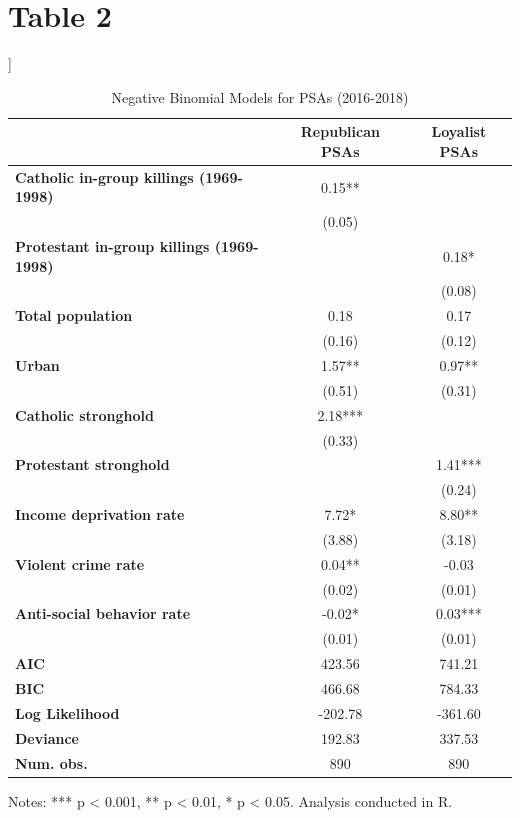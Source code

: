 \documentclass[12pt,letterpaper]{article}
\begin{document}
\section*{Table 2}
	]
	
	\begin{table}[htbp]
		\centering
		\caption{Negative Binomial Models for PSAs (2016-2018)}
		\begin{tabular}{lcc}
			\toprule
			& \textbf{Republican PSAs} & \textbf{Loyalist PSAs} \\
			\midrule
			\textbf{Catholic in-group killings (1969-1998)} & 0.15** & \\
			& (0.05) & \\
			\textbf{Protestant in-group killings (1969-1998)} & & 0.18* \\
			& & (0.08) \\
			\textbf{Total population} & 0.18 & 0.17 \\
			& (0.16) & (0.12) \\
			\textbf{Urban} & 1.57** & 0.97** \\
			& (0.51) & (0.31) \\
			\textbf{Catholic stronghold} & 2.18*** & \\
			& (0.33) & \\
			\textbf{Protestant stronghold} & & 1.41*** \\
			& & (0.24) \\
			\textbf{Income deprivation rate} & 7.72* & 8.80** \\
			& (3.88) & (3.18) \\
			\textbf{Violent crime rate} & 0.04** & -0.03 \\
			& (0.02) & (0.01) \\
			\textbf{Anti-social behavior rate} & -0.02* & 0.03*** \\
			& (0.01) & (0.01) \\
			\midrule
			\textbf{AIC} & 423.56 & 741.21 \\
			\textbf{BIC} & 466.68 & 784.33 \\
			\textbf{Log Likelihood} & -202.78 & -361.60 \\
			\textbf{Deviance} & 192.83 & 337.53 \\
			\textbf{Num. obs.} & 890 & 890 \\
			\bottomrule
		\end{tabular}
		\label{tab:negative_binomial}
		\medskip
		\small
		\raggedright
		Notes: *** p < 0.001, ** p < 0.01, * p < 0.05. Analysis conducted in R.
	\end{table}
	\newpage
\end{document}
